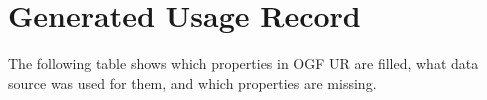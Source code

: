 \documentclass{article}                            %
\begin{document}





\newpage
\appendix

\section{Generated Usage Record}
\label{log2ur}
The following table shows which properties in OGF UR\cite{ur} are
filled, what data source was used for them, and which properties are
missing.

\end{document}

